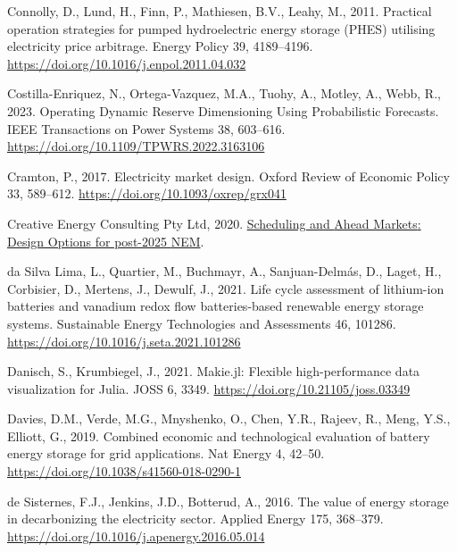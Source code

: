 \documentclass[12pt,a4paper,]{report}
\newlength{\cslhangindent}
\newenvironment{CSLReferences}[2] %
 {%
  \setlength{\parindent}{0pt}
  \ifodd #1 \everypar{\setlength{\hangindent}{\cslhangindent}}\ignorespaces\fi
  \ifnum #2 > 0
  \setlength{\parskip}{#2\baselineskip}
  \fi
 }%
 {}
\begin{document}
\begin{CSLReferences}{1}{0}
\leavevmode{}%
Connolly, D., Lund, H., Finn, P., Mathiesen, B.V., Leahy, M., 2011.
Practical operation strategies for pumped hydroelectric energy storage
({PHES}) utilising electricity price arbitrage. Energy Policy 39,
4189--4196. \url{https://doi.org/10.1016/j.enpol.2011.04.032}

\leavevmode{}%
Costilla-Enriquez, N., Ortega-Vazquez, M.A., Tuohy, A., Motley, A.,
Webb, R., 2023. Operating {Dynamic Reserve Dimensioning Using
Probabilistic Forecasts}. IEEE Transactions on Power Systems 38,
603--616. \url{https://doi.org/10.1109/TPWRS.2022.3163106}

\leavevmode{}%
Cramton, P., 2017. Electricity market design. Oxford Review of Economic
Policy 33, 589--612. \url{https://doi.org/10.1093/oxrep/grx041}

\leavevmode{}%
Creative Energy Consulting Pty Ltd, 2020.
\href{https://www.energycouncil.com.au/media/18717/20200630-cec-final-report.pdf}{Scheduling
and {Ahead Markets}: {Design Options} for post-2025 {NEM}}.

\leavevmode{}%
da Silva Lima, L., Quartier, M., Buchmayr, A., Sanjuan-Delmás, D.,
Laget, H., Corbisier, D., Mertens, J., Dewulf, J., 2021. Life cycle
assessment of lithium-ion batteries and vanadium redox flow
batteries-based renewable energy storage systems. Sustainable Energy
Technologies and Assessments 46, 101286.
\url{https://doi.org/10.1016/j.seta.2021.101286}

\leavevmode{}%
Danisch, S., Krumbiegel, J., 2021. Makie.jl: {Flexible} high-performance
data visualization for {Julia}. JOSS 6, 3349.
\url{https://doi.org/10.21105/joss.03349}

\leavevmode{}%
Davies, D.M., Verde, M.G., Mnyshenko, O., Chen, Y.R., Rajeev, R., Meng,
Y.S., Elliott, G., 2019. Combined economic and technological evaluation
of battery energy storage for grid applications. Nat Energy 4, 42--50.
\url{https://doi.org/10.1038/s41560-018-0290-1}

\leavevmode{}%
de Sisternes, F.J., Jenkins, J.D., Botterud, A., 2016. The value of
energy storage in decarbonizing the electricity sector. Applied Energy
175, 368--379. \url{https://doi.org/10.1016/j.apenergy.2016.05.014}


\end{CSLReferences}
\end{document}
